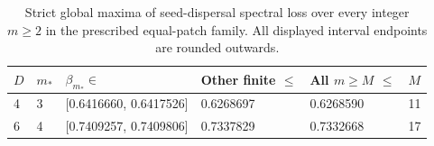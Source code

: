\begin{table}[htbp]
\centering
\caption{Strict global maxima of seed-dispersal spectral loss over every integer $m\geq2$ in the prescribed equal-patch family. All displayed interval endpoints are rounded outwards.}
\label{tab:global_peaks}
\begin{tabular}{llllll}
\toprule
$D$ & $m_*$ & $\beta_{m_*}\in$ & Other finite $\leq$ & All $m\geq M$ $\leq$ & $M$ \\
\midrule
4 & 3 & [0.6416660, 0.6417526] & 0.6268697 & 0.6268590 & 11 \\
6 & 4 & [0.7409257, 0.7409806] & 0.7337829 & 0.7332668 & 17 \\
\bottomrule
\end{tabular}
\end{table}
